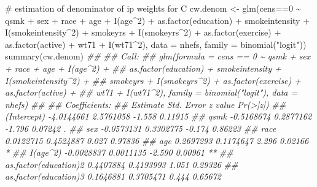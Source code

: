 \documentclass[
  10pt,
  a4paper,
]{book}
\newenvironment{Shaded}{\begin{snugshade}}{\end{snugshade}}
\newcommand{\AttributeTok}[1]{\textcolor[rgb]{0.40,0.45,0.13}{#1}}
\newcommand{\CommentTok}[1]{\textcolor[rgb]{0.37,0.37,0.37}{#1}}
\newcommand{\DecValTok}[1]{\textcolor[rgb]{0.68,0.00,0.00}{#1}}
\newcommand{\DocumentationTok}[1]{\textcolor[rgb]{0.37,0.37,0.37}{\textit{#1}}}
\newcommand{\FunctionTok}[1]{\textcolor[rgb]{0.28,0.35,0.67}{#1}}
\newcommand{\NormalTok}[1]{\textcolor[rgb]{0.00,0.46,0.62}{#1}}
\newcommand{\OtherTok}[1]{\textcolor[rgb]{0.00,0.46,0.62}{#1}}
\newcommand{\SpecialCharTok}[1]{\textcolor[rgb]{0.37,0.37,0.37}{#1}}
\newcommand{\StringTok}[1]{\textcolor[rgb]{0.13,0.47,0.30}{#1}}
\begin{document}
\begin{Shaded}
\begin{Highlighting}[]
\CommentTok{\# estimation of denominator of ip weights for C}
\NormalTok{cw.denom }\OtherTok{\textless{}{-}} \FunctionTok{glm}\NormalTok{(cens}\SpecialCharTok{==}\DecValTok{0} \SpecialCharTok{\textasciitilde{}}\NormalTok{ qsmk }\SpecialCharTok{+}\NormalTok{ sex }\SpecialCharTok{+}\NormalTok{ race }\SpecialCharTok{+}\NormalTok{ age }\SpecialCharTok{+} \FunctionTok{I}\NormalTok{(age}\SpecialCharTok{\^{}}\DecValTok{2}\NormalTok{) }
                     \SpecialCharTok{+} \FunctionTok{as.factor}\NormalTok{(education) }\SpecialCharTok{+}\NormalTok{ smokeintensity }\SpecialCharTok{+} \FunctionTok{I}\NormalTok{(smokeintensity}\SpecialCharTok{\^{}}\DecValTok{2}\NormalTok{) }
                     \SpecialCharTok{+}\NormalTok{ smokeyrs }\SpecialCharTok{+} \FunctionTok{I}\NormalTok{(smokeyrs}\SpecialCharTok{\^{}}\DecValTok{2}\NormalTok{) }\SpecialCharTok{+} \FunctionTok{as.factor}\NormalTok{(exercise) }
                     \SpecialCharTok{+} \FunctionTok{as.factor}\NormalTok{(active) }\SpecialCharTok{+}\NormalTok{ wt71 }\SpecialCharTok{+} \FunctionTok{I}\NormalTok{(wt71}\SpecialCharTok{\^{}}\DecValTok{2}\NormalTok{), }
                     \AttributeTok{data =}\NormalTok{ nhefs, }\AttributeTok{family =} \FunctionTok{binomial}\NormalTok{(}\StringTok{"logit"}\NormalTok{))}
\FunctionTok{summary}\NormalTok{(cw.denom)}
\DocumentationTok{\#\# }
\DocumentationTok{\#\# Call:}
\DocumentationTok{\#\# glm(formula = cens == 0 \textasciitilde{} qsmk + sex + race + age + I(age\^{}2) + }
\DocumentationTok{\#\#     as.factor(education) + smokeintensity + I(smokeintensity\^{}2) + }
\DocumentationTok{\#\#     smokeyrs + I(smokeyrs\^{}2) + as.factor(exercise) + as.factor(active) + }
\DocumentationTok{\#\#     wt71 + I(wt71\^{}2), family = binomial("logit"), data = nhefs)}
\DocumentationTok{\#\# }
\DocumentationTok{\#\# Coefficients:}
\DocumentationTok{\#\#                         Estimate Std. Error z value Pr(\textgreater{}|z|)   }
\DocumentationTok{\#\# (Intercept)           {-}4.0144661  2.5761058  {-}1.558  0.11915   }
\DocumentationTok{\#\# qsmk                  {-}0.5168674  0.2877162  {-}1.796  0.07242 . }
\DocumentationTok{\#\# sex                   {-}0.0573131  0.3302775  {-}0.174  0.86223   }
\DocumentationTok{\#\# race                   0.0122715  0.4524887   0.027  0.97836   }
\DocumentationTok{\#\# age                    0.2697293  0.1174647   2.296  0.02166 * }
\DocumentationTok{\#\# I(age\^{}2)              {-}0.0028837  0.0011135  {-}2.590  0.00961 **}
\DocumentationTok{\#\# as.factor(education)2  0.4407884  0.4193993   1.051  0.29326   }
\DocumentationTok{\#\# as.factor(education)3  0.1646881  0.3705471   0.444  0.65672   }

\end{Highlighting}
\end{Shaded}
\end{document}
